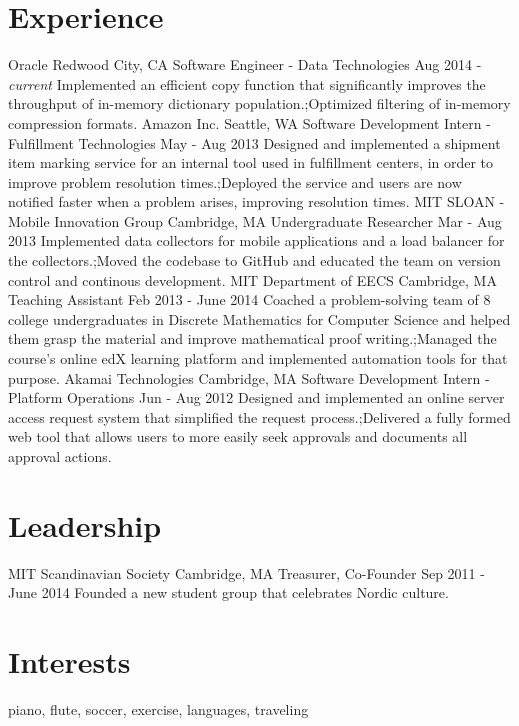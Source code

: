 \documentclass[]{friggeri-cv}
\begin{document}
\section{Experience}

\begin{entrylist}
  \expentry
    {Oracle}
    {Redwood City, CA}
    {Software Engineer - Data Technologies}
    {Aug 2014 - \textit{current}}
    {Implemented an efficient copy function that significantly improves the throughput of in-memory dictionary population.;Optimized filtering of in-memory compression formats.}
  \expentry
    {Amazon Inc.}
    {Seattle, WA}
    {Software Development Intern - Fulfillment Technologies}
    {May - Aug 2013}
    {Designed and implemented a shipment item marking service for an internal tool used in fulfillment centers, in order to improve problem resolution times.;Deployed the service and users are now notified faster when a problem arises, improving resolution times.}
  \expentry
    {MIT SLOAN - Mobile Innovation Group}
    {Cambridge, MA}
    {Undergraduate Researcher}
    {Mar - Aug 2013}
    {Implemented data collectors for mobile applications and a load balancer for the collectors.;Moved the codebase to GitHub and educated the team on version control and continous development.}
  \expentry
    {MIT Department of EECS}
    {Cambridge, MA}
    {Teaching Assistant}
    {Feb 2013 - June 2014}
    {Coached a problem-solving team of 8 college undergraduates in Discrete Mathematics for Computer Science and helped them grasp the material and improve mathematical proof writing.;Managed the course’s online edX learning platform and implemented automation tools for that purpose.}
  \expentry
    {Akamai Technologies}
    {Cambridge, MA}
    {Software Development Intern - Platform Operations}
    {Jun - Aug 2012}
    {Designed and implemented an online server access request system that simplified the request process.;Delivered a fully formed web tool that allows users to more easily seek approvals and documents all approval actions.}
\end{entrylist}

\section{Leadership}
\begin{entrylist}
  \expentry
    {MIT Scandinavian Society}
    {Cambridge, MA}
    {Treasurer, Co-Founder}
    {Sep 2011 - June 2014}
    {Founded a new student group that celebrates Nordic culture.}
\end{entrylist}

\section{Interests}
    piano, flute, soccer, exercise, languages, traveling
\end{document}
